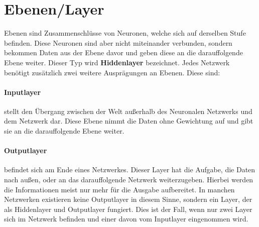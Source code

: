\section{Ebenen/Layer}
\label{sec:Layer}

Ebenen sind Zusammenschlüsse von Neuronen, welche sich auf derselben Stufe befinden. 
Diese Neuronen sind aber nicht miteinander verbunden, sondern bekommen Daten aus der Ebene davor und geben diese an die darauffolgende Ebene weiter. 
Dieser Typ wird \textbf{Hiddenlayer} bezeichnet. 
Jedes Netzwerk benötigt zusätzlich zwei weitere Ausprägungen an Ebenen. 
Diese sind:

\paragraph{Inputlayer} stellt den Übergang zwischen der Welt außerhalb des Neuronalen Netzwerks und dem Netzwerk dar.
Diese Ebene nimmt die Daten ohne Gewichtung auf und gibt sie an die darauffolgende Ebene weiter. 

\paragraph{Outputlayer} befindet sich am Ende eines Netzwerkes. 
Dieser Layer hat die Aufgabe, die Daten nach außen, oder an das darauffolgende Netzwerk weiterzugeben. 
Hierbei werden die Informationen meist nur mehr für die Ausgabe aufbereitet. 
In manchen Netzwerken existieren keine Outputlayer in diesem Sinne, sondern ein Layer, der als Hiddenlayer und Outputlayer fungiert. 
Dies ist der Fall, wenn nur zwei Layer sich im Netzwerk befinden und einer davon vom Inputlayer eingenommen wird.
\\

